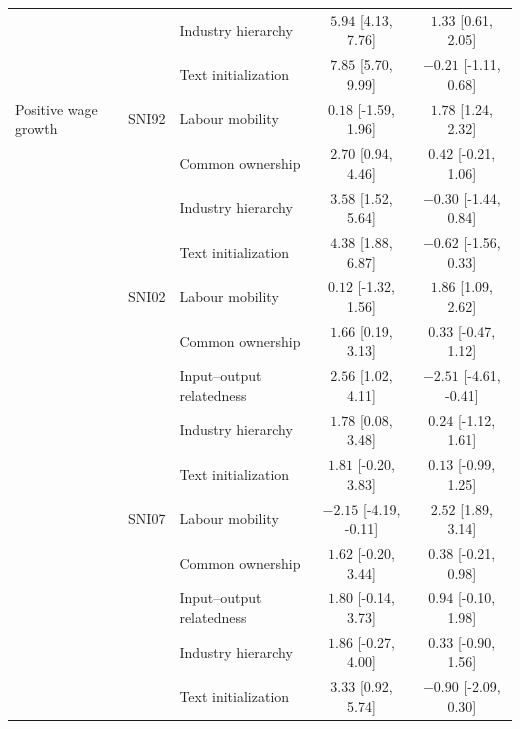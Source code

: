 \documentclass[9pt,twoside]{pnas-new}
\begin{document}
\begin{table}[H]
\begin{tabular}{lllcc}
 &  & Industry hierarchy & $5.94$ [4.13, 7.76] & $1.33$ [0.61, 2.05] \\
 &  & Text initialization & $7.85$ [5.70, 9.99] & $-0.21$ [-1.11, 0.68] \\
\midrule
Positive wage growth & SNI92 & Labour mobility & $0.18$ [-1.59, 1.96] & $1.78$ [1.24, 2.32] \\
 &  & Common ownership & $2.70$ [0.94, 4.46] & $0.42$ [-0.21, 1.06] \\
 &  & Industry hierarchy & $3.58$ [1.52, 5.64] & $-0.30$ [-1.44, 0.84] \\
 &  & Text initialization & $4.38$ [1.88, 6.87] & $-0.62$ [-1.56, 0.33] \\
\addlinespace[2pt]
 & SNI02 & Labour mobility & $0.12$ [-1.32, 1.56] & $1.86$ [1.09, 2.62] \\
 &  & Common ownership & $1.66$ [0.19, 3.13] & $0.33$ [-0.47, 1.12] \\
 &  & Input--output relatedness & $2.56$ [1.02, 4.11] & $-2.51$ [-4.61, -0.41] \\
 &  & Industry hierarchy & $1.78$ [0.08, 3.48] & $0.24$ [-1.12, 1.61] \\
 &  & Text initialization & $1.81$ [-0.20, 3.83] & $0.13$ [-0.99, 1.25] \\
\addlinespace[2pt]
 & SNI07 & Labour mobility & $-2.15$ [-4.19, -0.11] & $2.52$ [1.89, 3.14] \\
 &  & Common ownership & $1.62$ [-0.20, 3.44] & $0.38$ [-0.21, 0.98] \\
 &  & Input--output relatedness & $1.80$ [-0.14, 3.73] & $0.94$ [-0.10, 1.98] \\
 &  & Industry hierarchy & $1.86$ [-0.27, 4.00] & $0.33$ [-0.90, 1.56] \\
 &  & Text initialization & $3.33$ [0.92, 5.74] & $-0.90$ [-2.09, 0.30] \\
\bottomrule
\end{tabular}
\end{table}
\end{document}
